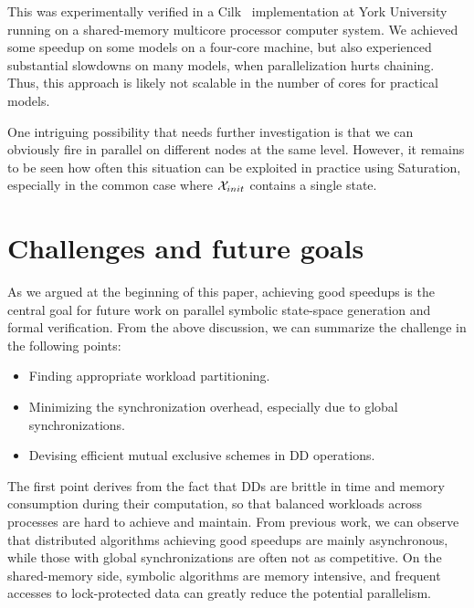 \documentclass[copyright,creativecommons]{eptcs}
\begin{document}
This was experimentally verified in a Cilk~\cite{Blumofe1996Cilk}
implementation at York University~\cite{2007CAV-Cilk} running on a
shared-memory multicore processor computer system.
We achieved some speedup on some models on a four-core machine, but also
experienced substantial slowdowns on many models,
when parallelization hurts chaining.
Thus, this approach is likely not scalable in the number of cores
for practical models.

One intriguing possibility that needs further investigation is that we
can obviously fire in parallel on different nodes at the same level.
However, it remains to be seen how often this situation can be exploited
in practice using Saturation, especially in the common case where
$\mathcal{X}_{init}$ contains a single state.




\section{Challenges and future goals}
\label{sec:challenge}

As we argued at the beginning of this paper, achieving good speedups
is the central goal for future work on parallel symbolic state-space
generation and formal verification.
From the above discussion, we can summarize the challenge in
the following points:
\begin{itemize}
\item Finding appropriate workload partitioning.
\item Minimizing the synchronization overhead, especially due to
      global synchronizations.
\item Devising efficient mutual exclusive schemes in DD operations.
\end{itemize}
The first point derives from the fact that DDs are brittle
in time and memory consumption during their computation, so that
balanced workloads across processes are hard to achieve and maintain.
From previous work, we can observe that distributed algorithms achieving
good speedups are mainly asynchronous, while those with global
synchronizations are often not as competitive.
On the shared-memory side,
symbolic algorithms are memory intensive, and frequent accesses to
lock-protected data can greatly reduce the potential parallelism.
\end{document}
